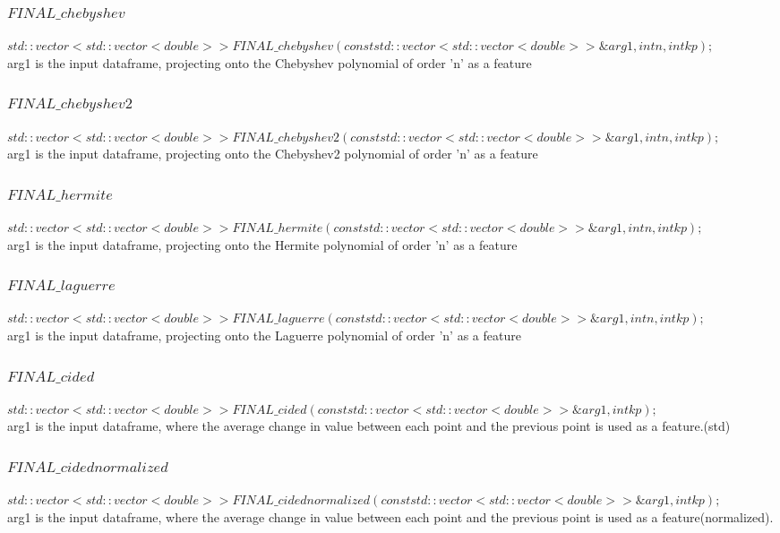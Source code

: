 \documentclass{article}
\begin{document}
\begin{CJK}{UTF8}{gbsn}
\begin{spacing}{1.5}
\subsubsection{$FINAL\_chebyshev$}
$std::vector<std::vector<double>> FINAL\_chebyshev(const std::vector<std::vector<double>> \&arg1, int n, int kp) ;$\\
arg1 is the input dataframe, projecting onto the Chebyshev polynomial of order 'n' as a feature
\subsubsection{$FINAL\_chebyshev2$}
$std::vector<std::vector<double>> FINAL\_chebyshev2(const std::vector<std::vector<double>> \&arg1, int n, int kp) ;$\\
arg1 is the input dataframe, projecting onto the Chebyshev2 polynomial of order 'n' as a feature
\subsubsection{$FINAL\_hermite$}
$std::vector<std::vector<double>> FINAL\_hermite(const std::vector<std::vector<double>> \&arg1, int n, int kp) ;$\\
arg1 is the input dataframe, projecting onto the Hermite polynomial of order 'n' as a feature
\subsubsection{$FINAL\_laguerre$}
$std::vector<std::vector<double>> FINAL\_laguerre(const std::vector<std::vector<double>> \&arg1, int n, int kp) ;$\\
arg1 is the input dataframe, projecting onto the Laguerre polynomial of order 'n' as a feature
\subsubsection{$FINAL\_cided$}
$std::vector<std::vector<double>> FINAL\_cided(const std::vector<std::vector<double>> \&arg1, int kp) ;$\\
arg1 is the input dataframe, where the average change in value between each point and the previous point is used as a feature.(std)

\subsubsection{$FINAL\_cidednormalized$}
$std::vector<std::vector<double>> FINAL\_cidednormalized(const std::vector<std::vector<double>> \&arg1, int kp) ;$\\
arg1 is the input dataframe, where the average change in value between each point and the previous point is used as a feature(normalized).

\end{spacing}
\end{CJK}
\end{document}
